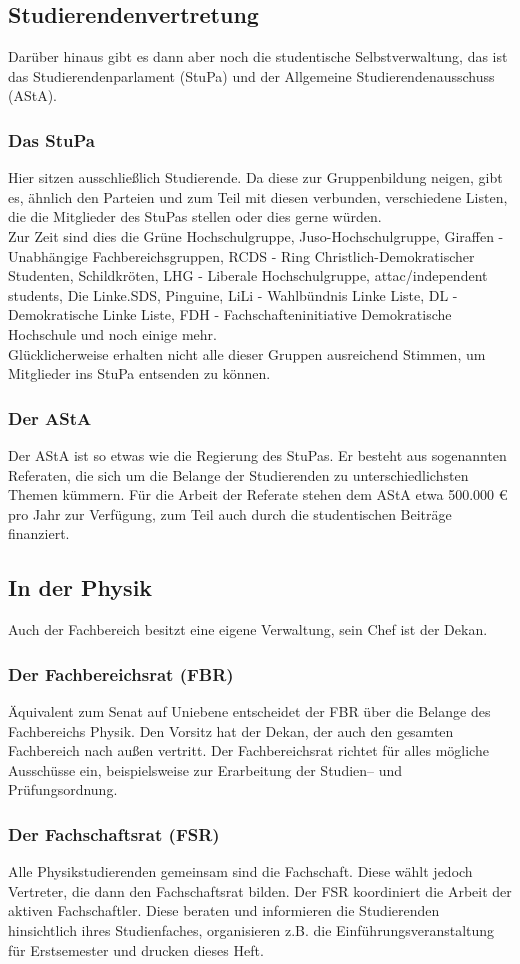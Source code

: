 \newpage
\subsection{Studierendenvertretung}
Darüber hinaus gibt es dann aber noch die studentische Selbstverwaltung, 
das ist das Studierendenparlament (StuPa) und der Allgemeine Studierendenausschuss (AStA).

\subsubsection{Das StuPa}
Hier sitzen ausschließlich Studierende. 
Da diese zur Gruppenbildung neigen, gibt es, ähnlich den Parteien und zum Teil mit diesen verbunden, 
verschiedene Listen, die die Mitglieder des StuPas stellen oder dies gerne würden.\\
Zur Zeit sind dies die Grüne Hochschulgruppe, Juso-Hochschulgruppe, Giraffen - Unabhängige
Fachbereichsgruppen, RCDS - Ring Christlich-Demokratischer Studenten, 
Schildkröten, LHG - Liberale Hochschulgruppe, attac/independent students, 
Die Linke.SDS, Pinguine, LiLi - Wahlbündnis Linke Liste,
DL - Demokratische Linke Liste, FDH - Fachschafteninitiative Demokratische Hochschule und noch einige mehr.\\
Glücklicherweise erhalten nicht alle dieser Gruppen ausreichend Stimmen, um Mitglieder 
ins StuPa entsenden zu können.

\subsubsection{Der AStA}
Der AStA ist so etwas wie die Regierung des StuPas.
Er besteht aus sogenannten Referaten, die sich um die Belange der Studierenden zu unterschiedlichsten Themen kümmern.
Für die Arbeit der Referate stehen dem AStA etwa 500.000 \euro{} pro Jahr zur Verfügung, 
zum Teil auch durch die studentischen Beiträge finanziert.
%
%
\subsection{In der Physik}
Auch der Fachbereich besitzt eine eigene Verwaltung, sein Chef ist der Dekan.

\subsubsection{Der Fachbereichsrat (FBR)}
Äquivalent zum Senat auf Uniebene entscheidet der FBR über die Belange des Fachbereichs Physik.
Den Vorsitz hat der Dekan, der auch den gesamten Fachbereich nach außen vertritt.
Der Fachbereichsrat richtet für alles mögliche Ausschüsse ein, 
beispielsweise zur Erarbeitung der Studien-- und Prüfungsordnung.

\subsubsection{Der Fachschaftsrat (FSR)}
Alle Physikstudierenden gemeinsam sind die Fachschaft.
Diese wählt jedoch Vertreter, die dann den Fachschaftsrat bilden.
Der FSR koordiniert die Arbeit der aktiven Fachschaftler.
Diese beraten und informieren die Studierenden hinsichtlich ihres Studienfaches, 
organisieren z.B. die Einführungsveranstaltung für Erstsemester und drucken dieses Heft.
%
